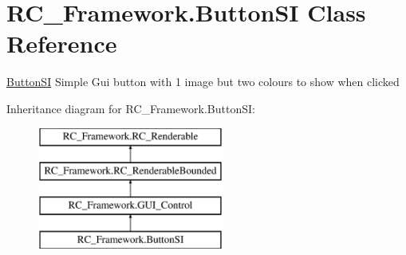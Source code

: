 \hypertarget{class_r_c___framework_1_1_button_s_i}{}\section{R\+C\+\_\+\+Framework.\+Button\+SI Class Reference}
\label{class_r_c___framework_1_1_button_s_i}


\mbox{\hyperlink{class_r_c___framework_1_1_button_s_i}{Button\+SI}} Simple Gui button with 1 image but two colours to show when clicked  


Inheritance diagram for R\+C\+\_\+\+Framework.\+Button\+SI\+:\begin{figure}[H]
\begin{center}
\leavevmode
\includegraphics[height=4.000000cm]{class_r_c___framework_1_1_button_s_i}
\end{center}
\end{figure}
